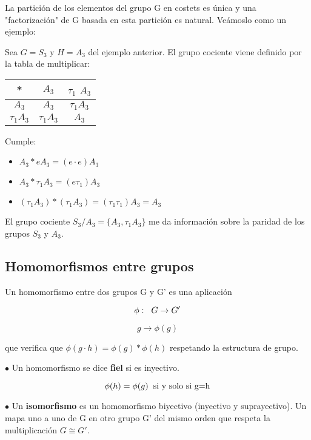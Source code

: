 \documentclass{article}
\begin{document}
La partición de los elementos del grupo G en costets es única y una "factorización" de G basada en esta partición es natural. Veámoslo como un ejemplo:

\smallskip
Sea $G=S_3$ y $H=A_3$ del ejemplo anterior. El grupo cociente viene definido por la tabla de multiplicar:
\begin{center}
\begin{tabular}[b]{ c | c c}
* & $A_3$ & $\tau _1$ $A_3$\\
\hline
$A_3$ & $A_3$ & $\tau _1 A_3$ \\

$\tau _1 A_3$ & $\tau _1 A_3$ & $A_3$
\end{tabular}

\end{center}


Cumple:

\begin{itemize}
\item $A_3*eA_3=(e\cdot e)A_3$
\item $A_3*\tau _1A_3=(e\tau _1)A_3$

\item $(\tau _1A_3)*(\tau _1 A_3)=(\tau _1 \tau _1)A_3=A_3$

\end{itemize}

\smallskip
El grupo cociente $S_3/A_3= \lbrace A_3, \tau _1 A_3\rbrace $ me da información sobre la paridad de los grupos $S_3$ y $A_3$.

\subsection{Homomorfismos entre grupos}
Un homomorfismo entre dos grupos G y G' es una aplicación

$$\phi : \hspace{0.2cm} G \rightarrow G'$$

$$g\rightarrow \phi(g)$$

que verifica que $\phi (g\cdot h)=\phi (g)*\phi (h)$ respetando la estructura de grupo.

\smallskip
$\bullet$ Un homomorfismo se dice \textbf{fiel} si es inyectivo.

$$\phi (h)=\phi (g) \hspace{0.2cm} \text{si y solo si g=h}$$

\smallskip
$\bullet$ Un \textbf{isomorfismo} es un homomorfismo biyectivo (inyectivo y suprayectivo). Un mapa uno a uno de G en otro grupo G' del mismo orden que respeta la multiplicación $G\cong G'$.
\end{document}
